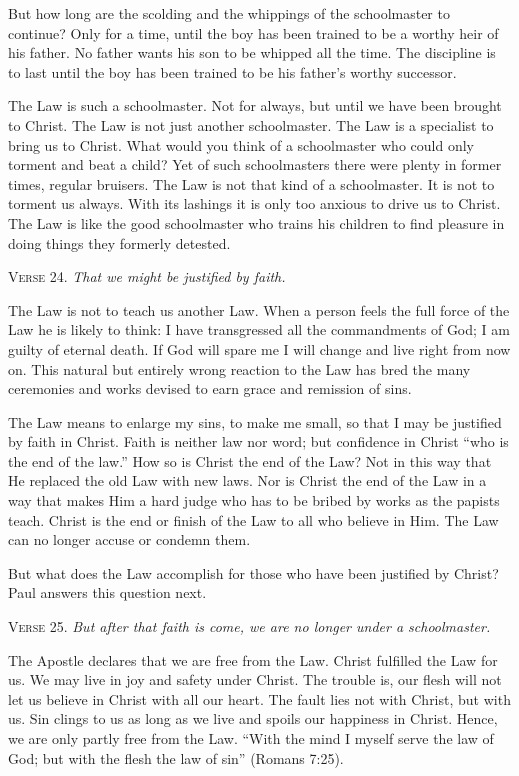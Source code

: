 But how long are the scolding and the whippings of the schoolmaster to continue? Only for a time, until the boy has been trained to be a worthy heir of his father. No father wants his son to be whipped all the time. The discipline is to last until the boy has been trained to be his father’s worthy successor.

The Law is such a schoolmaster. Not for always, but until we have been brought to Christ. The Law is not just another schoolmaster. The Law is a specialist to bring us to Christ. What would you think of a schoolmaster who could only torment and beat a child? Yet of such schoolmasters there were plenty in former times, regular bruisers. The Law is not that kind of a schoolmaster. It is not to torment us always. With its lashings it is only too anxious to drive us to Christ. The Law is like the good schoolmaster who trains his children to find pleasure in doing things they formerly detested.

\textsc{Verse} 24. \emph{That we might be justified by faith.}

The Law is not to teach us another Law. When a person feels the full force of the Law he is likely to think: I have transgressed all the commandments of God; I am guilty of eternal death. If God will spare me I will change and live right from now on. This natural but entirely wrong reaction to the Law has bred the many ceremonies and works devised to earn grace and remission of sins.

The Law means to enlarge my sins, to make me small, so that I may be justified by faith in Christ. Faith is neither law nor word; but confidence in Christ “who is the end of the law.” How so is Christ the end of the Law? Not in this way that He replaced the old Law with new laws. Nor is Christ the end of the Law in a way that makes Him a hard judge who has to be bribed by works as the papists teach. Christ is the end or finish of the Law to all who believe in Him. The Law can no longer accuse or condemn them.

But what does the Law accomplish for those who have been justified by Christ? Paul answers this question next.

\textsc{Verse} 25. \emph{But after that faith is come, we are no longer under a schoolmaster.}

The Apostle declares that we are free from the Law. Christ fulfilled the Law for us. We may live in joy and safety under Christ. The trouble is, our flesh will not let us believe in Christ with all our heart. The fault lies not with Christ, but with us. Sin clings to us as long as we live and spoils our happiness in Christ. Hence, we are only partly free from the Law. “With the mind I myself serve the law of God; but with the flesh the law of sin” (Romans 7:25).

